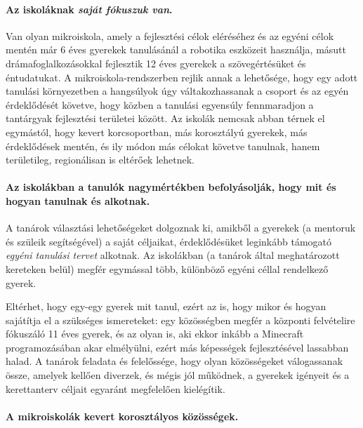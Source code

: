 \paragraph{Az iskoláknak \emph{saját fókuszuk van}.}

    Van olyan mikroiskola, amely a fejlesztési célok eléréséhez és az egyéni célok
    mentén már 6 éves gyerekek tanulásánál a robotika eszközeit használja,
    másutt drámafoglalkozásokkal fejlesztik 12 éves gyerekek a szövegértésüket és
    éntudatukat. A
    mikroiskola-rendszerben rejlik annak a lehetősége, hogy egy adott tanulási
    környezetben a hangsúlyok úgy váltakozhassanak a csoport és az egyén
    érdeklődését követve, hogy közben a tanulási egyensúly fennmaradjon a
    tantárgyak fejlesztési területei között. Az iskolák nemcsak abban térnek el
    egymástól, hogy kevert korcsoportban, más korosztályú gyerekek, más
    érdeklődések mentén, és ily módon más célokat követve tanulnak, hanem
    területileg, regionálisan is eltérőek lehetnek.


  \paragraph{Az iskolákban a tanulók nagymértékben befolyásolják, hogy mit és hogyan tanulnak és alkotnak.}

    A tanárok választási lehetőségeket dolgoznak ki, amikből a gyerekek (a
    mentoruk és szüleik segítségével) a saját céljaikat, érdeklődésüket leginkább
    támogató \emph{egyéni tanulási tervet} alkotnak. Az iskolákban (a tanárok által
    meghatározott kereteken belül) megfér egymással több, különböző egyéni céllal
    rendelkező gyerek.

    Eltérhet, hogy egy-egy gyerek mit tanul, ezért az is, hogy mikor és hogyan
    sajátítja el a szükséges ismereteket: egy közösségben megfér a központi
    felvételire fókuszáló 11 éves gyerek, és az olyan is, aki ekkor inkább a
    Mine\-craft programozásában akar elmélyülni, ezért más képességek fejlesztésével
    lassabban halad. A tanárok feladata és felelőssége, hogy olyan közösségeket
    válogassanak össze, amelyek kellően diverzek, és mégis jól működnek, a gyerekek
    igényeit és a kerettanterv céljait egyaránt megfelelően kielégítik.

  \paragraph{A mikroiskolák kevert korosztályos közösségek.}

